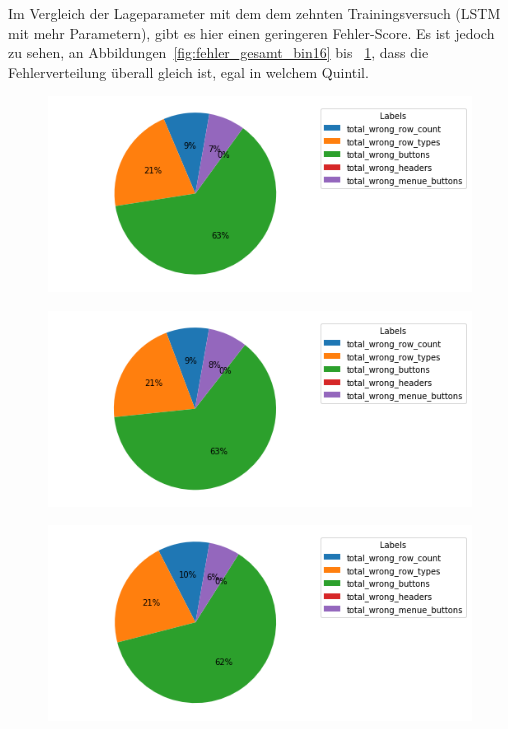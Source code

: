 \documentclass[pdftex,a4paper,halfparskip, article]{scrartcl}
\begin{document}
Im Vergleich der Lageparameter mit dem dem zehnten Trainingsversuch (LSTM mit mehr Parametern), gibt es hier einen geringeren Fehler-Score. Es ist jedoch zu sehen, an Abbildungen~\ref{fig:fehler_gesamt_bin16} bis ~\ref{fig:fehler_schlechteste20_bin16}, dass die Fehlerverteilung überall gleich ist, egal in welchem Quintil.

\begin{figure}
\centering
\begin{minipage}{.5\textwidth}
  \centering
  \includegraphics[width=1\linewidth]{predictions_bin16_total_error_types_pie_chart}
  \label{fig:fehler_gesamt_bin16}
\end{minipage}%
\begin{minipage}{.5\textwidth}
  \centering
  \includegraphics[width=1\linewidth]{predictions_bin16_excluded_p80_error_types_pie_chart}
  \label{fig:fehler_beste80_bin16}
\end{minipage}
\begin{minipage}{.5\textwidth}
  \centering
   \includegraphics[width=1\linewidth]{predictions_bin16_p80_error_types_pie_chart}
  \label{fig:fehler_schlechteste20_bin16}
\end{minipage}
\end{figure}
\end{document}
